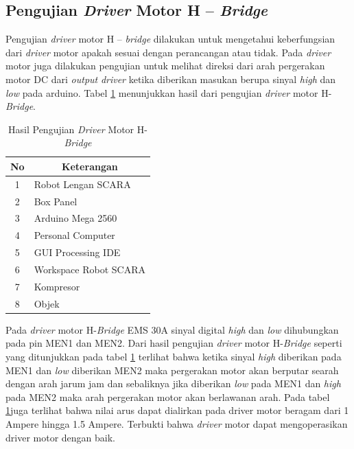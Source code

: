 \subsection{Pengujian \textit{Driver} Motor H – \textit{Bridge}}
Pengujian \textit{driver} motor H – \textit{bridge} dilakukan untuk mengetahui keberfungsian dari \textit{driver} motor apakah sesuai dengan perancangan atau tidak. Pada \textit{driver} motor juga dilakukan pengujian untuk melihat direksi dari arah pergerakan motor DC dari \textit{output} \textit{driver} ketika diberikan masukan berupa sinyal \textit{high} dan \textit{low} pada arduino. Tabel \ref{tbl.drivermotor} menunjukkan hasil dari pengujian \textit{driver} motor H-\textit{Bridge}. 
\begin{table}[H]
	\centering
	\caption{Hasil Pengujian \textit{Driver} Motor H-\textit{Bridge}}
		\label{tbl.drivermotor}
	\begin{tabular}{|c|l|}
		\hline
		\rowcolor[HTML]{9B9B9B} 
	
		No & \multicolumn{1}{c|}{\cellcolor[HTML]{9B9B9B}Keterangan} \\ \hline
		1  & Robot Lengan SCARA                                      \\ \hline
		2  & Box Panel                                               \\ \hline
		3  & Arduino Mega 2560                                       \\ \hline
		4  & Personal Computer                                       \\ \hline
		5  & GUI Processing IDE                                      \\ \hline
		6  & Workspace Robot SCARA                                   \\ \hline
		7  & Kompresor                                               \\ \hline
		8  & Objek                                                   \\ \hline
	\end{tabular}
	
\end{table} 

 Pada \textit{driver} motor H-\textit{Bridge} EMS 30A sinyal digital \textit{high} dan \textit{low} dihubungkan pada pin MEN1 dan MEN2. Dari hasil pengujian \textit{driver} motor H-\textit{Bridge} seperti yang ditunjukkan pada tabel \ref{tbl.drivermotor} terlihat bahwa ketika sinyal \textit{high} diberikan pada MEN1 dan \textit{low} diberikan MEN2 maka pergerakan motor akan berputar searah dengan arah jarum jam dan sebaliknya jika diberikan \textit{low} pada MEN1 dan \textit{high} pada MEN2 maka arah pergerakan motor akan berlawanan arah. Pada tabel \ref{tbl.drivermotor}juga terlihat bahwa nilai arus dapat dialirkan pada driver motor beragam dari 1 Ampere hingga 1.5 Ampere. Terbukti bahwa \textit{driver} motor dapat mengoperasikan driver motor dengan baik.

